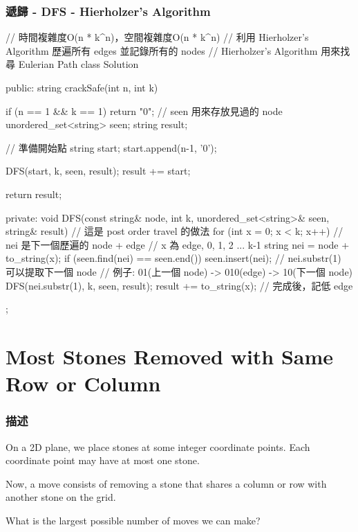 \subsubsection{遞歸 - DFS - Hierholzer's Algorithm}
\begin{Code}
// 時間複雜度O(n * k^n)，空間複雜度O(n * k^n)
// 利用 Hierholzer's Algorithm 歷遍所有 edges 並記錄所有的 nodes
// Hierholzer's Algorithm 用來找尋 Eulerian Path
class Solution {
public:
    string crackSafe(int n, int k) {
        if (n == 1 && k == 1) return "0";
        // seen 用來存放見過的 node
        unordered_set<string> seen;
        string result;

        // 準備開始點
        string start; start.append(n-1, '0');

        DFS(start, k, seen, result);
        result += start;

        return result;
    }
private:
    void DFS(const string& node, int k, unordered_set<string>& seen, string& result)
    {
        // 這是 post order travel 的做法
        for (int x = 0; x < k; x++)
        {
            // nei 是下一個歷遍的 node + edge
            // x 為 edge, 0, 1, 2 ... k-1
            string nei = node + to_string(x);
            if (seen.find(nei) == seen.end())
            {
                seen.insert(nei);
                // nei.substr(1) 可以提取下一個 node
                // 例子: 01(上一個 node) -> 010(edge) -> 10(下一個 node)
                DFS(nei.substr(1), k, seen, result);
                result += to_string(x); // 完成後，記低 edge
            }
        }
    }
};
\end{Code}

\section{Most Stones Removed with Same Row or Column} %
\label{sec:most-stones-removed-with-same-row-or-column}


\subsubsection{描述}
On a 2D plane, we place stones at some integer coordinate points.  Each coordinate point may have at most one stone.

Now, a move consists of removing a stone that shares a column or row with another stone on the grid.

What is the largest possible number of moves we can make?

